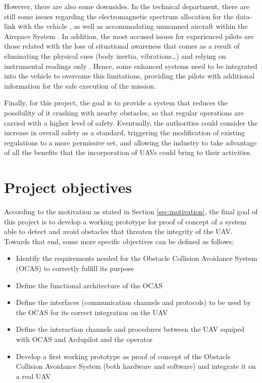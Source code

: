 However, there are also some downsides.
In the technical department, there are still some issues regarding the electromagnetic spectrum allocation for the data-link with the vehicle \cite{civilianunmannedaerialvehiclesreadyfortakeoff2012}, as well as accommodating unmanned aircraft within the Airspace System \cite{unmannedaircraftsystemsperceptionsandpotentials2013}.
In addition, the most accused issues for experienced pilots are those related with the loss of situational awareness that comes as a result of eliminating the physical cues (body inertia, vibrations\ldots) and relying on instrumental readings only \cite{bergqvist2014}.
Hence, some enhanced systems need to be integrated into the vehicle to overcome this limitations, providing the pilots with additional information for the safe execution of the mission.

Finally, for this project, the goal is to provide a system that reduces the possibility of it crashing with nearby obstacles, so that regular operations are carried with a higher level of safety.
Eventually, the authorities could consider the increase in overall safety as a standard, triggering the modification of existing regulations to a more permissive set, and allowing the industry to take advantage of all the benefits that the incorporation of UAVs could bring to their activities.

\section{Project objectives} \label{sec:objectives}

According to the motivation as stated in Section \ref{sec:motivation}, the final goal of this project is to develop a working prototype for proof of concept of a system able to detect and avoid obstacles that threaten the integrity of the UAV. Towards that end, some more specific objectives can be defined as follows:
\begin{itemize}
	\item Identify the requirements needed for the Obstacle Collision Avoidance System (OCAS) to correctly fulfill its purpose
	\item Define the functional architecture of the OCAS
	\item Define the interfaces (communication channels and protocols) to be used by the OCAS for its correct integration on the UAV
	\item Define the interaction channels and procedures between the UAV equiped with OCAS and Ardupilot and the operator
	\item Develop a first working prototype as proof of concept of the Obstacle Collision Avoidance System (both hardware and software) and integrate it on a real UAV
\end{itemize}

